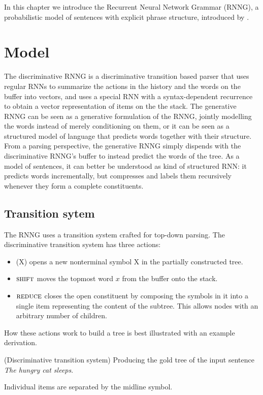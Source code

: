 % 

In this chapter we introduce the Recurrent Neural Network Grammar (RNNG), a probabilistic model of sentences with explicit phrase structure, introduced by \citet{dyer2016rnng}.

\section{Model}
The discriminative RNNG is a discriminative transition based parser that uses regular RNNs to summarize the actions in the history and the words on the buffer into vectors, and uses a special RNN with a syntax-dependent recurrence to obtain a vector representation of items on the the stack. The generative RNNG can be seen as a generative formulation of the RNNG, jointly modelling the words instead of merely conditioning on them, or it can be seen as a structured model of language that predicts words together with their structure. From a parsing perspective, the generative RNNG simply dispends with the discriminative RNNG's buffer to instead predict the words of the tree. As a model of sentences, it can better be understood as kind of structured RNN: it predicts words incrementally, but compresses and labels them recursively whenever they form a complete constituents.

\subsection{Transition sytem}
The RNNG uses a transition system crafted for top-down parsing. The discriminative transition system has three actions:
\begin{itemize}
  \item \open(X) opens a new nonterminal symbol X in the partially constructed tree.
  \item $\textsc{shift}$ moves the topmost word $x$ from the buffer onto the stack.
  \item $\textsc{reduce}$ closes the open constituent by composing the symbols in it into a single item representing the content of the subtree. This allows nodes with an arbitrary number of children.
\end{itemize}
How these actions work to build a tree is best illustrated with an example derivation.

\begin{example}{(Discriminative transition system)}
  \label{ex:disc-states}
  Producing the gold tree of the input sentence \textit{The hungry cat sleeps}.
  

  Individual items are separated by the midline symbol.
\end{example}


